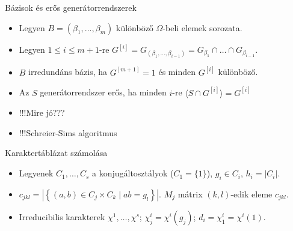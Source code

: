 \documentclass[mathserif]{beamer}
\begin{document}
\begin{frame}{Bázisok és erős generátorrendszerek}
\begin{itemize}
\item Legyen $B = (\beta_1, \dots, \beta_m)$ különböző $\Omega$-beli elemek sorozata.
\item Legyen $1\le i\le m+1$-re $G^{[i]} = G_{(\beta_1,\dots,\beta_{i-1})} = G_{\beta_1}\cap\dots\cap G_{\beta_{i-1}}$.
\item $B$ \alert{irredundáns bázis}, ha $G^{[m+1]}=1$ és minden $G^{[i]}$ különböző.
\item Az $S$ generátorrendszer \alert{erős}, ha minden $i$-re $\langle S \cap G^{[i]}\rangle = G^{[i]}$
\item !!!Mire jó???
\item !!!Schreier-Sims algoritmus
\end{itemize}
\end{frame}

\begin{frame}{Karaktertáblázat számolása}
\begin{itemize}
\item Legyenek $C_1, \dots, C_s$ a konjugáltosztályok ($C_1 = \{1\}$), $g_i \in C_i$, $h_i = |C_i|$.
\item $c_{jkl} = \left|\left\{(a,b)\in C_j \times C_k \mid ab = g_l\right\}\right|$. $M_j$ mátrix $(k,l)$-edik eleme $c_{jkl}$.
\item Irreducibilis karakterek $\chi^1, \dots, \chi^s$; $\chi^i_j = \chi^i(g_j)$; $d_i = \chi^i_1 = \chi^i(1)$.

\end{itemize}
\end{frame}
\end{document}

